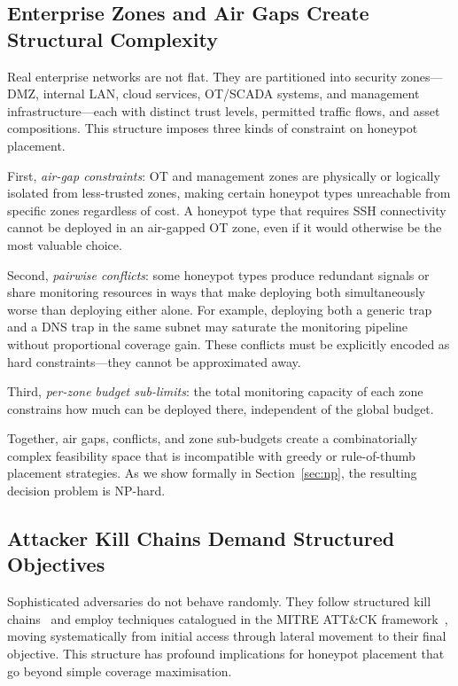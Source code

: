 \documentclass[journal]{IEEEtran}
\begin{document}
\subsection{Enterprise Zones and Air Gaps Create Structural Complexity}
\label{sec:intro:zones}

Real enterprise networks are not flat. They are partitioned into
security zones---DMZ, internal LAN, cloud services, OT/SCADA
systems, and management infrastructure---each with distinct trust
levels, permitted traffic flows, and asset compositions. This
structure imposes three kinds of constraint on honeypot placement.

First, \emph{air-gap constraints}: OT and management zones are
physically or logically isolated from less-trusted zones, making
certain honeypot types unreachable from specific zones regardless
of cost. A honeypot type that requires SSH connectivity cannot be
deployed in an air-gapped OT zone, even if it would otherwise be
the most valuable choice.

Second, \emph{pairwise conflicts}: some honeypot types produce
redundant signals or share monitoring resources in ways that make
deploying both simultaneously worse than deploying either alone. For
example, deploying both a generic trap and a DNS trap in the same
subnet may saturate the monitoring pipeline without proportional
coverage gain. These conflicts must be explicitly encoded as
hard constraints---they cannot be approximated away.

Third, \emph{per-zone budget sub-limits}: the total monitoring
capacity of each zone constrains how much can be deployed there,
independent of the global budget.

Together, air gaps, conflicts, and zone sub-budgets create a
combinatorially complex feasibility space that is incompatible with
greedy or rule-of-thumb placement strategies. As we show formally
in Section~\ref{sec:np}, the resulting decision problem is NP-hard.

\subsection{Attacker Kill Chains Demand Structured Objectives}
\label{sec:intro:killchain}

Sophisticated adversaries do not behave randomly. They follow
structured kill chains~\cite{hutchins2011} and employ techniques
catalogued in the MITRE ATT\&CK framework~\cite{mitre2023}, moving
systematically from initial access through lateral movement to their
final objective. This structure has profound implications for honeypot
placement that go beyond simple coverage maximisation.
\end{document}
